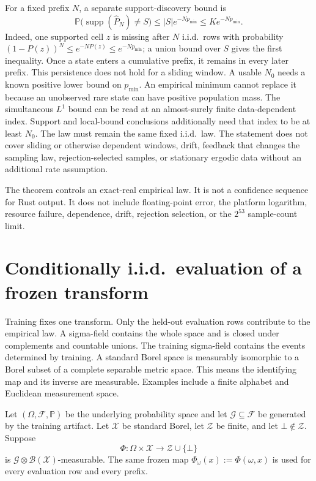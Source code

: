 \documentclass[11pt]{article}
\theoremstyle{definition}
\newcommand{\cZ}{\mathcal{Z}}
\newcommand{\supp}{\operatorname{supp}}
\newcommand{\Phat}{\widehat{P}}
\newcommand{\Prb}{\mathbb{P}}
\begin{document}
	For a fixed prefix $N$, a separate support-discovery bound is
\begin{equation}
  \Prb\bigl(\supp(\Phat_N)\ne S\bigr)
  \le |S|e^{-Np_{\min}}
  \le Ke^{-Np_{\min}}.
	\end{equation}
	Indeed, one supported cell $z$ is missing after $N$ i.i.d.\ rows with probability
	$(1-P(z))^N\le e^{-NP(z)}\le e^{-Np_{\min}}$; a union bound over $S$ gives the first inequality.
	Once a state enters a cumulative prefix, it remains in every later prefix.  This persistence
	does not hold for a sliding window.
	A usable $N_0$ needs a known positive lower bound on $p_{\min}$.  An empirical minimum cannot
	replace it because an unobserved rare state can have positive population mass.  The simultaneous
	$L^1$ bound can be read at an almost-surely finite data-dependent index.  Support and local-bound
	conclusions additionally need that index to be at least $N_0$.  The law must remain the same
	fixed i.i.d.\ law.  The statement does not cover sliding or otherwise dependent windows, drift,
	feedback that changes the sampling law, rejection-selected samples, or stationary ergodic data
	without an additional rate assumption.

The theorem controls an exact-real empirical law.  It is not a confidence sequence for Rust
output.  It does not include floating-point error, the platform logarithm, resource failure,
dependence, drift, rejection selection, or the $2^{53}$ sample-count limit.

\section{Conditionally i.i.d.\ evaluation of a frozen transform}

Training fixes one transform. Only the held-out evaluation rows contribute to the empirical
law. A sigma-field contains the whole space and is closed under complements and countable
unions. The training sigma-field contains the events determined by training. A standard Borel
space is measurably isomorphic to a Borel subset of a complete separable metric space. This
means the identifying map and its inverse are measurable. Examples include a finite alphabet
and Euclidean measurement space.

Let $(\Omega,\mathcal F,\Prb)$ be the underlying probability space and let
$\mathcal G\subseteq\mathcal F$ be generated by the training artifact.  Let $\mathcal X$ be
standard Borel, let $\cZ$ be finite, and let $\bot\notin\cZ$.  Suppose
\[
  \Phi:\Omega\times\mathcal X\longrightarrow\cZ\cup\{\bot\}
\]
is $\mathcal G\otimes\mathcal B(\mathcal X)$-measurable.  The same frozen map
$\Phi_\omega(x):=\Phi(\omega,x)$ is used for every evaluation row and every prefix.
\end{document}
